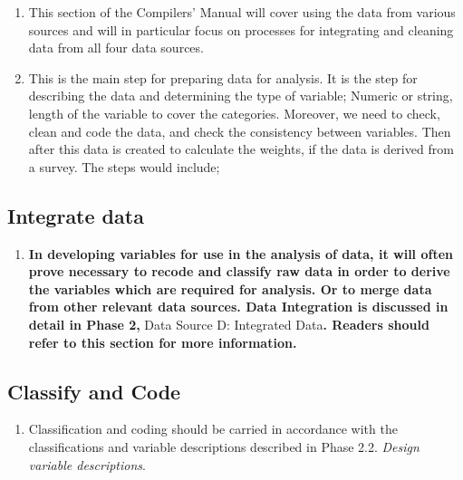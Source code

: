 \documentclass[
]{article}
\providecommand{\tightlist}{%
  \setlength{\itemsep}{0pt}\setlength{\parskip}{0pt}}
\begin{document}
\begin{enumerate}
\def\labelenumi{\arabic{enumi}.}
\setcounter{enumi}{368}
\item
  This section of the Compilers' Manual will cover using the data
  from various sources and will in particular focus on processes for
  integrating and cleaning data from all four data sources.
\item
  This is the main step for preparing data for analysis. It is the
  step for describing the data and determining the type of variable;
  Numeric or string, length of the variable to cover the categories.
  Moreover, we need to check, clean and code the data, and check the
  consistency between variables. Then after this data is created to
  calculate the weights, if the data is derived from a survey. The
  steps would include;
\end{enumerate}

\hypertarget{integrate-data}{%
\subsection{Integrate data}\label{integrate-data}}

\begin{enumerate}
\def\labelenumi{\arabic{enumi}.}
\setcounter{enumi}{370}
\tightlist
\item
  \textbf{In developing variables for use in the analysis of data, it will
  often prove necessary to recode and classify raw data in order to
  derive the variables which are required for analysis. Or to merge
  data from other relevant data sources. Data Integration is discussed
  in detail in Phase 2,} Data Source D: Integrated Data\textbf{. Readers
  should refer to this section for more information.}
\end{enumerate}

\hypertarget{classify-and-code}{%
\subsection{Classify and Code}\label{classify-and-code}}

\begin{enumerate}
\def\labelenumi{\arabic{enumi}.}
\setcounter{enumi}{371}
\tightlist
\item
  Classification and coding should be carried in accordance with the
  classifications and variable descriptions described in Phase 2.2.
  \emph{Design variable descriptions}.
\end{enumerate}
\end{document}
